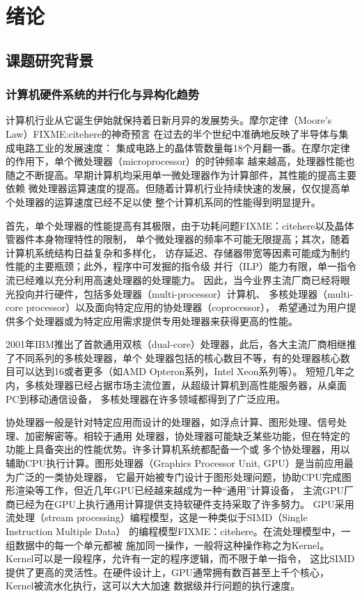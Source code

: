 \chapter{绪论}

\section{课题研究背景}

\subsection{计算机硬件系统的并行化与异构化趋势}
计算机行业从它诞生伊始就保持着日新月异的发展势头。摩尔定律（Moore's Law）FIXME:citehere的神奇预言
在过去的半个世纪中准确地反映了半导体与集成电路工业的发展速度：
集成电路上的晶体管数量每18个月翻一番。在摩尔定律的作用下，单个微处理器（microprocessor）的时钟频率
越来越高，处理器性能也随之不断提高。早期计算机均采用单一微处理器作为计算部件，其性能的提高主要依赖
微处理器运算速度的提高。但随着计算机行业持续快速的发展，仅仅提高单个处理器的运算速度已经不足以使
整个计算机系同的性能得到明显提升。

首先，单个处理器的性能提高有其极限，由于功耗问题FIXME：citehere以及晶体管器件本身物理特性的限制，
单个微处理器的频率不可能无限提高；其次，随着计算机系统结构日益复杂和多样化，
访存延迟、存储器带宽等因素可能成为制约性能的主要瓶颈；此外，程序中可发掘的指令级
并行（ILP）能力有限，单一指令流已经难以充分利用高速处理器的处理能力。
因此，当今业界主流厂商已经将眼光投向并行硬件，包括多处理器（multi-processor）计算机、
多核处理器（multi-core processor）以及面向特定应用的协处理器（coprocessor），
希望通过为用户提供多个处理器或为特定应用需求提供专用处理器来获得更高的性能。

2001年IBM推出了首款通用双核（dual-core）处理器，此后，各大主流厂商相继推了不同系列的多核处理器，单个
处理器包括的核心数目不等，有的处理器核心数目可以达到16或者更多（如AMD Opteron系列，Intel Xeon系列等）。
短短几年之内，多核处理器已经占据市场主流位置，从超级计算机到高性能服务器，从桌面PC到移动通信设备，
多核处理器在许多领域都得到了广泛应用。

协处理器一般是针对特定应用而设计的处理器，如浮点计算、图形处理、信号处理、加密解密等。相较于通用
处理器，协处理器可能缺乏某些功能，但在特定的功能上具备突出的性能优势。许多计算机系统都配备一个或
多个协处理器，用以辅助CPU执行计算。图形处理器（Graphics Processor Unit, GPU）是当前应用最为广泛的一类协处理器，
它最开始被专门设计于图形处理问题，协助CPU完成图形渲染等工作，但近几年GPU已经越来越成为一种“通用”计算设备，
主流GPU厂商已经为在GPU上执行通用计算提供支持软硬件支持采取了许多努力。
GPU采用流处理（stream processing）编程模型，这是一种类似于SIMD（Single Instruction Multiple Data）
的编程模型FIXME：citehere。在流处理模型中，一组数据中的每一个单元都被
施加同一操作，一般将这种操作称之为Kernel。Kernel可以是一段程序，允许有一定的程序逻辑，而不限于单一指令，
这比SIMD提供了更高的灵活性。在硬件设计上，GPU通常拥有数百甚至上千个核心，Kernel被流水化执行，这可以大大加速
数据级并行问题的执行速度。

